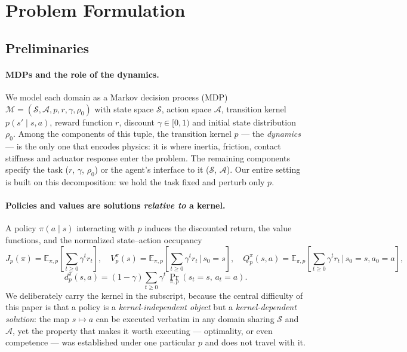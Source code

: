 
\section{Problem Formulation}
\label{preliminary}

\subsection{Preliminaries}

\paragraph{MDPs and the role of the dynamics.}
We model each domain as a Markov decision process (MDP)
$\mathcal{M} = (\mathcal{S}, \mathcal{A}, p, r, \gamma, \rho_0)$ with state space
$\mathcal{S}$, action space $\mathcal{A}$, transition kernel
$p(s' \mid s, a)$, reward function $r$, discount $\gamma \in [0,1)$ and initial
state distribution $\rho_0$. Among the components of this tuple, the transition
kernel $p$ --- the \emph{dynamics} --- is the only one that encodes physics: it
is where inertia, friction, contact stiffness and actuator response enter the
problem. The remaining components specify the task ($r$, $\gamma$, $\rho_0$) or
the agent's interface to it ($\mathcal{S}$, $\mathcal{A}$). Our entire setting
is built on this decomposition: we hold the task fixed and perturb only $p$.

\paragraph{Policies and values are solutions \emph{relative to} a kernel.}
A policy $\pi(a \mid s)$ interacting with $p$ induces the discounted return, the
value functions, and the normalized state--action occupancy
\begin{equation}
J_{p}(\pi) = \mathbb{E}_{\pi,p}\!\left[\sum_{t\ge0} \gamma^t r_t\right],
\quad
V^{\pi}_{p}(s) = \mathbb{E}_{\pi,p}\!\left[\sum_{t\ge0} \gamma^{t} r_t \,\Big|\, s_0 = s\right],
\quad
Q^{\pi}_{p}(s,a) = \mathbb{E}_{\pi,p}\!\left[\sum_{t\ge0} \gamma^{t} r_t \,\Big|\, s_0 = s, a_0 = a\right],
\end{equation}
\begin{equation}
d^{\pi}_{p}(s,a) = (1-\gamma)\sum_{t\ge0}\gamma^{t}\,
\Pr_{\pi,p}\!\left(s_t = s,\, a_t = a\right).
\label{eq:occupancy}
\end{equation}
We deliberately carry the kernel in the subscript, because the central
difficulty of this paper is that a policy is a \emph{kernel-independent object}
but a \emph{kernel-dependent solution}: the map $s \mapsto a$ can be executed
verbatim in any domain sharing $\mathcal{S}$ and $\mathcal{A}$, yet the property
that makes it worth executing --- optimality, or even competence --- was
established under one particular $p$ and does not travel with it.


